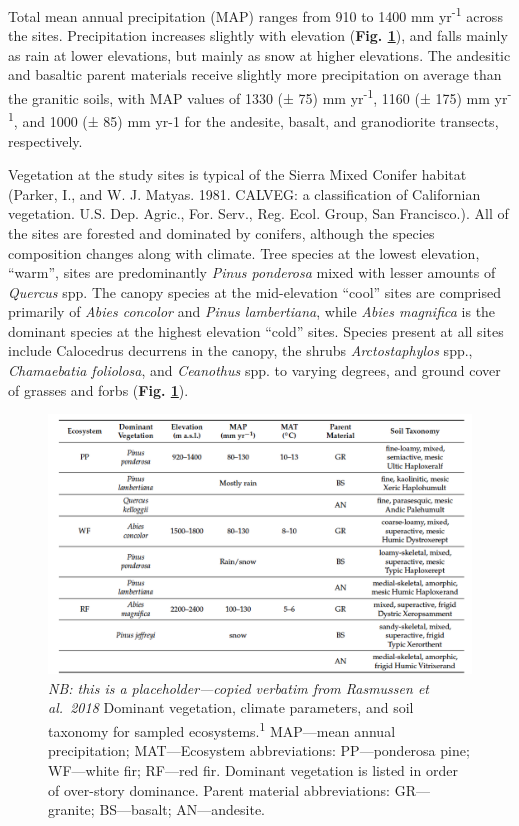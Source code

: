 \documentclass[english,man,floatsintext]{apa6}
\begin{document}
Total mean annual precipitation (MAP) ranges from 910 to 1400 mm yr\textsuperscript{-1} across the sites. Precipitation increases slightly with elevation (\textbf{Fig. \ref{fig:exp-design-ras18}}), and falls mainly as rain at lower elevations, but mainly as snow at higher elevations. The andesitic and basaltic parent materials receive slightly more precipitation on average than the granitic soils, with MAP values of 1330 (± 75) mm yr\textsuperscript{-1}, 1160 (± 175) mm yr\textsuperscript{-1}, and 1000 (± 85) mm yr-1 for the andesite, basalt, and granodiorite transects, respectively.

Vegetation at the study sites is typical of the Sierra Mixed Conifer habitat (Parker, I., and W. J. Matyas. 1981. CALVEG: a classification of Californian vegetation. U.S. Dep. Agric., For. Serv., Reg. Ecol. Group, San Francisco.). All of the sites are forested and dominated by conifers, although the species composition changes along with climate. Tree species at the lowest elevation, \enquote{warm}, sites are predominantly \emph{Pinus ponderosa} mixed with lesser amounts of \emph{Quercus} spp. The canopy species at the mid-elevation \enquote{cool} sites are comprised primarily of \emph{Abies concolor} and \emph{Pinus lambertiana}, while \emph{Abies magnifica} is the dominant species at the highest elevation \enquote{cold} sites. Species present at all sites include Calocedrus decurrens in the canopy, the shrubs \emph{Arctostaphylos} spp., \emph{Chamaebatia foliolosa}, and \emph{Ceanothus} spp. to varying degrees, and ground cover of grasses and forbs (\textbf{Fig. \ref{fig:exp-design-ras18}}).




\begin{figure}

{\centering \includegraphics[width=1\linewidth]{../data/img/exp_design_ras18} 

}

\caption{\emph{NB: this is a placeholder---copied verbatim from Rasmussen et al.~2018} Dominant vegetation, climate parameters, and soil taxonomy for sampled ecosystems.\textsuperscript{1} MAP---mean annual precipitation; MAT---Ecosystem abbreviations: PP---ponderosa pine; WF---white fir; RF---red fir. Dominant vegetation is listed in order of over-story dominance. Parent material abbreviations: GR---granite;
BS---basalt; AN---andesite.}\label{fig:exp-design-ras18}
\end{figure}
\end{document}
